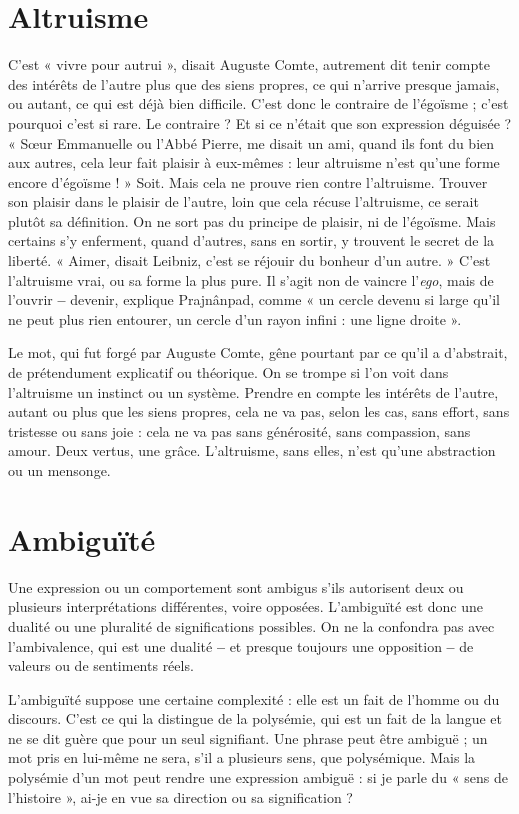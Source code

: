\section{Altruisme}
C'est « vivre pour autrui », disait Auguste Comte, autrement dit
tenir compte des intérêts de l’autre plus que des siens propres,
ce qui n’arrive presque jamais, ou autant, ce qui est déjà bien difficile. C’est
donc le contraire de l’égoïsme ; c’est pourquoi c’est si rare. Le contraire ? Et si
ce n’était que son expression déguisée ? « Sœur Emmanuelle ou l'Abbé Pierre,
me disait un ami, quand ils font du bien aux autres, cela leur fait plaisir à eux-mêmes :
leur altruisme n’est qu’une forme encore d’égoïsme ! » Soit. Mais cela
ne prouve rien contre l’altruisme. Trouver son plaisir dans le plaisir de l’autre,
loin que cela récuse l’altruisme, ce serait plutôt sa définition. On ne sort pas du
principe de plaisir, ni de l’égoïsme. Mais certains s'y enferment, quand
d’autres, sans en sortir, y trouvent le secret de la liberté. « Aimer, disait Leibniz,
c’est se réjouir du bonheur d’un autre. » C’est l’altruisme vrai, ou sa forme la
plus pure. Il s’agit non de vaincre l'{\it ego}, mais de l'ouvrir {\bf --} devenir, explique Prajnânpad,
comme « un cercle devenu si large qu’il ne peut plus rien entourer, un
cercle d’un rayon infini : une ligne droite ».

Le mot, qui fut forgé par Auguste Comte, gêne pourtant par ce qu'il a
d’abstrait, de prétendument explicatif ou théorique. On se trompe si l'on voit
dans l’altruisme un instinct ou un système. Prendre en compte les intérêts de
l’autre, autant ou plus que les siens propres, cela ne va pas, selon les cas, sans
effort, sans tristesse ou sans joie : cela ne va pas sans générosité, sans compassion,
sans amour. Deux vertus, une grâce. L’altruisme, sans elles, n’est qu'une
abstraction ou un mensonge.

\section{Ambiguïté}
Une expression ou un comportement sont ambigus s’ils autorisent
deux ou plusieurs interprétations différentes, voire opposées.
L’ambiguïté est donc une dualité ou une pluralité de significations possibles.
On ne la confondra pas avec l’ambivalence, qui est une dualité {\bf --} et
presque toujours une opposition {\bf --} de valeurs ou de sentiments réels.

L’ambiguïté suppose une certaine complexité : elle est un fait de l’homme
ou du discours. C’est ce qui la distingue de la polysémie, qui est un fait de la
langue et ne se dit guère que pour un seul signifiant. Une phrase peut être
ambiguë ; un mot pris en lui-même ne sera, s’il a plusieurs sens, que polysémique.
Mais la polysémie d’un mot peut rendre une expression ambiguë : si je
parle du « sens de l’histoire », ai-je en vue sa direction ou sa signification ?

